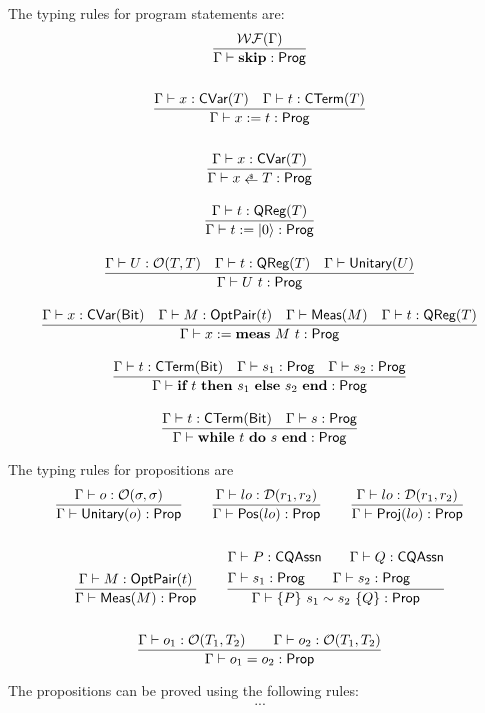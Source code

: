 The typing rules for program statements are:
\begin{gather*}
    \frac{\WF{\Gamma}}{\Gamma \vdash \Skip : \prog} \\
    \\
    \frac{\Gamma \vdash x : \cvar{T} \quad \Gamma \vdash t : \CTerm{T}}{\Gamma \vdash \Assign{x}{t} : \prog} \\
    \\
    \frac{\Gamma \vdash x : \cvar{T}}{\Gamma \vdash \pAssign{x}{T} : \prog} \\
    \\
    \frac{\Gamma \vdash t : \qreg{T}}{\Gamma \vdash \Init{t} : \prog} \\
    \\
    \frac{\Gamma \vdash U : \opt{T}{T} \quad \Gamma \vdash t : \qreg{T} \quad \Gamma \vdash \unitary{U}}{\Gamma \vdash U\ t : \prog} \\
    \\
    \frac{\Gamma \vdash x : \cvar{\bit} \quad \Gamma \vdash M : \optpair{t} \quad \Gamma \vdash \meas{M} \quad \Gamma \vdash t : \qreg{T} }{\Gamma \vdash \MeaAssign{x}{M}{t} : \prog} \\
    \\
    \frac{\Gamma \vdash t : \CTerm{\bit} \quad \Gamma \vdash s_1 : \prog \quad \Gamma \vdash s_2 : \prog}
    {\Gamma \vdash \If{t}{s_1}{s_2} : \prog} \\
    \\
    \frac{\Gamma \vdash t : \CTerm{\bit} \quad \Gamma \vdash s : \prog}
    {\Gamma \vdash \While{t}{s} : \prog}
\end{gather*}



The typing rules for propositions are
\begin{gather*}
    \frac{\Gamma \vdash o : \mathcal{O}(\sigma, \sigma)}{\Gamma \vdash \textsf{Unitary}({o}) : \textsf{Prop}}
    \qquad
    \frac{\Gamma \vdash lo : \mathcal{D}(r_1, r_2)}{\Gamma \vdash \textsf{Pos}({lo}) : \textsf{Prop}} 
    \qquad
    \frac{\Gamma \vdash lo : \mathcal{D}(r_1, r_2)}{\Gamma \vdash \textsf{Proj}({lo}) : \textsf{Prop}} \\
    \\
    \frac{\Gamma \vdash M : \textsf{OptPair}(t)}{\Gamma \vdash \textsf{Meas}(M) : \textsf{Prop}}
    \qquad
    \frac{
        \begin{aligned}
            & \Gamma \vdash P : \textsf{CQAssn} \qquad \Gamma \vdash Q : \textsf{CQAssn} \\
            & \Gamma \vdash s_1 : \textsf{Prog} \qquad \Gamma \vdash s_2 : \textsf{Prog}
        \end{aligned}}
        {
            \Gamma \vdash \{P\}~s_1 \sim s_2~\{Q\} : \textsf{Prop}
        } \\
    \\
    \frac{\Gamma \vdash o_1 : \mathcal{O}(T_1, T_2) \qquad \Gamma \vdash o_2 : \mathcal{O}(T_1, T_2)}{\Gamma \vdash o_1 = o_2 : \textsf{Prop}}
\end{gather*}


The propositions can be proved using the following rules:
\begin{gather*}
    ...
\end{gather*}